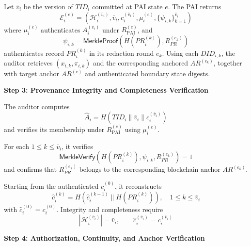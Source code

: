 \documentclass[lettersize,journal]{IEEEtran}
\begin{document}
Let $\bar v_i$ be the version of $TID_i$ committed at PAI state $e$.
The PAI returns
\begin{equation}
\mathcal{E}_i^{(e)}
=
\left(
\mathcal{H}_i^{(\bar v_i)},\bar v_i,c_i^{(\bar v_i)},
\mu_i^{(e)},\{\psi_{i,k}\}_{k=1}^{\bar v_i}
\right)
\label{eq:audit-evidence}
\end{equation}
where $\mu_i^{(e)}$ authenticates
$A_i^{(\bar v_i)}$ under $R_{\mathrm{PAI}}^{(e)}$, and
\begin{equation}
\psi_{i,k}
=
\mathsf{MerkleProof}
\left(H(PR_i^{(k)}),R_{PR}^{(e_k)}\right)
\label{eq:record-path}
\end{equation}
authenticates record $PR_i^{(k)}$ in its redaction round $e_k$.
Using each $DID_{i,k}$, the auditor retrieves $(x_{i,k},\pi_{i,k})$
and the corresponding anchored $AR^{(e_k)}$, together with target
anchor $AR^{(e)}$ and authenticated boundary state digests.

\noindent\textbf{Step 3: Provenance Integrity and Completeness Verification}

The auditor computes
\begin{equation}
\widehat A_i
=
H(TID_i\parallel\bar v_i\parallel c_i^{(\bar v_i)})
\label{eq:audit-entry}
\end{equation}
and verifies its membership under $R_{\mathrm{PAI}}^{(e)}$ using
$\mu_i^{(e)}$. 

For each $1\le k\le\bar v_i$, it verifies
\begin{equation}
\mathsf{MerkleVerify}
\left(H(PR_i^{(k)}),\psi_{i,k},R_{PR}^{(e_k)}\right)=1
\label{eq:audit-record-merkle}
\end{equation}
and confirms that $R_{PR}^{(e_k)}$ belongs to the corresponding
blockchain anchor $AR^{(e_k)}$.

Starting from the authenticated $c_i^{(0)}$, it reconstructs
\begin{equation}
\widehat c_i^{(k)}
=
H\left(
\widehat c_i^{(k-1)}\parallel H(PR_i^{(k)})
\right),
\quad
1\le k\le\bar v_i
\label{eq:audit-chain}
\end{equation}
with $\widehat c_i^{(0)}=c_i^{(0)}$. Integrity and completeness require
\begin{equation}
|\mathcal H_i^{(\bar v_i)}|=\bar v_i,\qquad
\widehat c_i^{(\bar v_i)}=c_i^{(\bar v_i)}
\label{eq:audit-completeness}
\end{equation}

\noindent\textbf{Step 4: Authorization, Continuity, and Anchor Verification}
\end{document}
